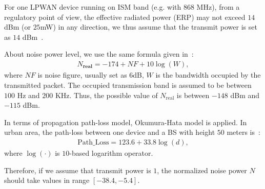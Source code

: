For one LPWAN device running on ISM band (e.g. with 868 MHz), from a regulatory point of view, the effective radiated power (ERP) may not exceed $14$ dBm (or $25$mW) in any direction, we thus assume that the transmit power is set as $14$ dBm~\cite{lora/specification}.

About noise power level, we use the same formula given in~\cite{georgiou2017low}:
\begin{align}
	N_{\textbf{real}} = -174 + NF + 10\log(W) ,
\end{align}
where $NF$ is noise figure, usually set as $6$dB, $W$ is the bandwidth occupied by the transmitted packet. The occupied transmission band is assumed to be between $100$ Hz and $200$ KHz. Thus, the possible value of $N_{\text{real}}$ is between $-148$ dBm and $-115$ dBm.

In terms of propagation path-loss model, Okumura-Hata model is applied. In urban area, the path-loss between one device and a BS with height $50$ meters is~\cite{lagrange2000reseaux}:  
\begin{align}
	\text{Path_Loss}= 123.6+33.8\log(d),
\end{align}
where $\log(\cdot)$ is $10$-based logarithm operator.

Therefore, if we assume that transmit power is $1$, the normalized noise power $N$ should take values in range $\left[ -38.4, -5.4\right] $. 




